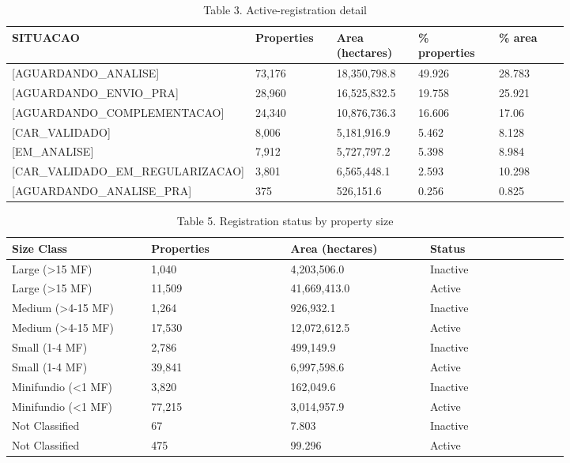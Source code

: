 \documentclass[12pt]{article}
\begin{document}
\begin{table}[H]
\centering
\caption{Table 3. Active-registration detail}
{\fontsize{12}{14}\selectfont
\setlength{\tabcolsep}{3pt}
\renewcommand{\arraystretch}{1.08}
\begin{tabular}{p{0.164\linewidth}p{0.164\linewidth}p{0.164\linewidth}p{0.164\linewidth}p{0.164\linewidth}}
\toprule
SITUACAO & Properties & Area (hectares) & \% properties & \% area \\
\midrule
{[}AGUARDANDO\_\allowbreak{}ANALISE{]} & 73,176 & 18,350,798.8 & 49.926 & 28.783 \\
{[}AGUARDANDO\_\allowbreak{}ENVIO\_\allowbreak{}PRA{]} & 28,960 & 16,525,832.5 & 19.758 & 25.921 \\
{[}AGUARDANDO\_\allowbreak{}COMPLEMENTACAO{]} & 24,340 & 10,876,736.3 & 16.606 & 17.06 \\
{[}CAR\_\allowbreak{}VALIDADO{]} & 8,006 & 5,181,916.9 & 5.462 & 8.128 \\
{[}EM\_\allowbreak{}ANALISE{]} & 7,912 & 5,727,797.2 & 5.398 & 8.984 \\
{[}CAR\_\allowbreak{}VALIDADO\_\allowbreak{}EM\_\allowbreak{}REGULARIZACAO{]} & 3,801 & 6,565,448.1 & 2.593 & 10.298 \\
{[}AGUARDANDO\_\allowbreak{}ANALISE\_\allowbreak{}PRA{]} & 375 & 526,151.6 & 0.256 & 0.825 \\
\bottomrule
\end{tabular}
}
\end{table}

\begin{table}[H]
\centering
\caption{Table 5. Registration status by property size}
{\fontsize{12}{14}\selectfont
\setlength{\tabcolsep}{3pt}
\renewcommand{\arraystretch}{1.08}
\begin{tabular}{p{0.205\linewidth}p{0.205\linewidth}p{0.205\linewidth}p{0.205\linewidth}}
\toprule
Size Class & Properties & Area (hectares) & Status \\
\midrule
Large (>15 MF) & 1,040 & 4,203,506.0 & Inactive \\
Large (>15 MF) & 11,509 & 41,669,413.0 & Active \\
Medium (>4-15 MF) & 1,264 & 926,932.1 & Inactive \\
Medium (>4-15 MF) & 17,530 & 12,072,612.5 & Active \\
Small (1-4 MF) & 2,786 & 499,149.9 & Inactive \\
Small (1-4 MF) & 39,841 & 6,997,598.6 & Active \\
Minifundio (<1 MF) & 3,820 & 162,049.6 & Inactive \\
Minifundio (<1 MF) & 77,215 & 3,014,957.9 & Active \\
Not Classified & 67 & 7.803 & Inactive \\
Not Classified & 475 & 99.296 & Active \\
\bottomrule
\end{tabular}
}
\end{table}
\end{document}
